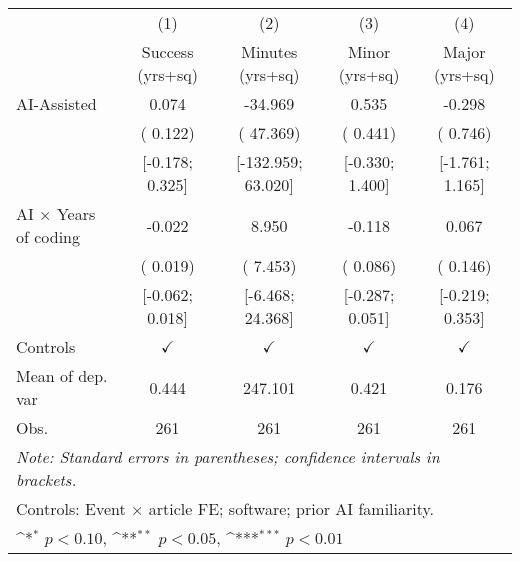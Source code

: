 \def\sym#1{\ifmmode^{#1}\else\(^{#1}\)\fi}
\begin{tabular}{l*{4}{c}}
\hline\hline
 & (1) & (2) & (3) & (4)
\\
 & Success (yrs+sq) & Minutes (yrs+sq) & Minor (yrs+sq) & Major (yrs+sq)
 \\
\hline
AI-Assisted &  0.074 & -34.969 &  0.535 & -0.298
\\
 & ( 0.122) & ( 47.369) & ( 0.441) & ( 0.746)
\\
 & [-0.178;  0.325] & [-132.959;  63.020] & [-0.330;  1.400] & [-1.761;  1.165]
\\
AI × Years of coding & -0.022 &  8.950 & -0.118 &  0.067
\\
 & ( 0.019) & ( 7.453) & ( 0.086) & ( 0.146)
\\
 & [-0.062;  0.018] & [-6.468;  24.368] & [-0.287;  0.051] & [-0.219;  0.353]
\\
\hline
Controls & $\checkmark$ & $\checkmark$ & $\checkmark$ & $\checkmark$
\\
Mean of dep. var &  0.444 &  247.101 &  0.421 &  0.176
\\
Obs. & 261 & 261 & 261 & 261
\\
\hline
\hline\hline
\multicolumn{5}{l}{\it{Note:} Standard errors in parentheses; confidence intervals in brackets.}\\
\multicolumn{5}{l}{Controls: Event $\times$ article FE; software; prior AI familiarity.}\\
\multicolumn{5}{l}{\sym{*} $p<0.10$, \sym{**} $p<0.05$,  \sym{***} $p<0.01$}\\
\end{tabular}
